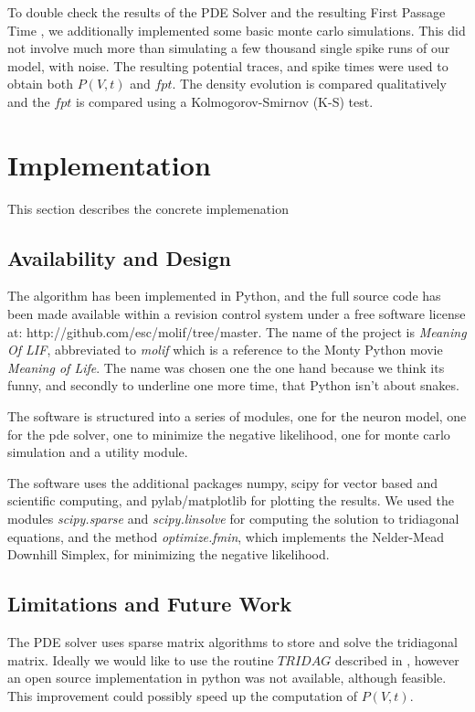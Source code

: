 \documentclass[10pt]{article}
\begin{document}
To double check the results of the PDE Solver and the resulting First
Passage Time , we additionally implemented some basic monte carlo
simulations. This did not involve much more than simulating a few
thousand single spike runs of our model, with noise. The resulting
potential traces, and spike times were used to obtain both $P(V,t)$
and $fpt$. The density evolution is compared qualitatively and the
$fpt$ is compared using a Kolmogorov-Smirnov (K-S) test\cite{press}.


\section{Implementation}

This section describes the concrete implemenation

\subsection{Availability and Design}

The algorithm has been implemented in Python, and the full source code
has been made available within a revision control system under a free
software license at: http://github.com/esc/molif/tree/master. The name
of the project is {\it Meaning Of LIF}, abbreviated to {\it molif}
which is a reference to the Monty Python movie {\it Meaning of Life}.
The name was chosen one the one hand because we think its funny, and
secondly to underline one more time, that Python isn't about snakes.


The software is structured into a series of modules, one for the neuron model,
one for the pde solver, one to minimize the negative likelihood, one for monte
carlo simulation and a utility module.

The software uses the additional packages numpy, scipy for vector
based and scientific computing, and pylab/matplotlib for plotting the
results. We used the modules {\it scipy.sparse} and {\it
scipy.linsolve} for computing the solution to tridiagonal equations, and the
method {\it optimize.fmin}, which implements the Nelder-Mead Downhill
Simplex, for minimizing the negative likelihood.


\subsection{Limitations and Future Work}

The PDE solver uses sparse matrix algorithms to store and solve the
tridiagonal matrix. Ideally we would like to use the routine $TRIDAG$
described in \cite{press}, however an open source implementation in
python was not available, although feasible. This improvement could
possibly speed up the computation of $P(V,t)$.
\end{document}
